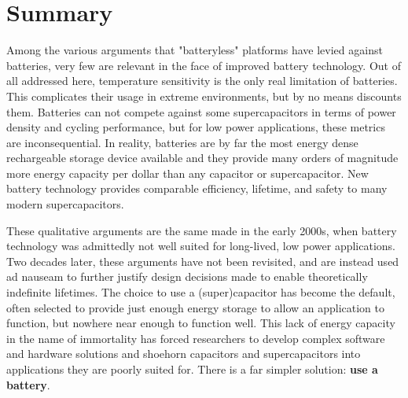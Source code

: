 \section{Summary}
Among the various arguments that "batteryless" platforms have levied against batteries, very few are relevant in the face of improved battery technology. Out of all addressed here, temperature sensitivity is the only real limitation of batteries. This complicates their usage in extreme environments, but by no means discounts them. Batteries can not compete against some supercapacitors in terms of power density and cycling performance, but for low power applications, these metrics are inconsequential. 
In reality, batteries are by far the most energy dense rechargeable storage device available and they provide many orders of magnitude more energy capacity per dollar than any capacitor or supercapacitor. New battery technology provides comparable efficiency, lifetime, and safety to many modern supercapacitors. 

These qualitative arguments are the same made in the early 2000s, when battery technology was admittedly not well suited for long-lived, low power applications. Two decades later, these arguments have not been revisited, and are instead used ad nauseam to further justify design decisions made to enable theoretically indefinite lifetimes. 
The choice to use a (super)capacitor has become the default, often selected to provide just enough energy storage to allow an application to function, but nowhere near enough to function well. This lack of energy capacity in the name of immortality has forced researchers to develop complex software and hardware solutions and shoehorn capacitors and supercapacitors into applications they are poorly suited for. There is a far simpler solution: \textbf{use a battery}.

